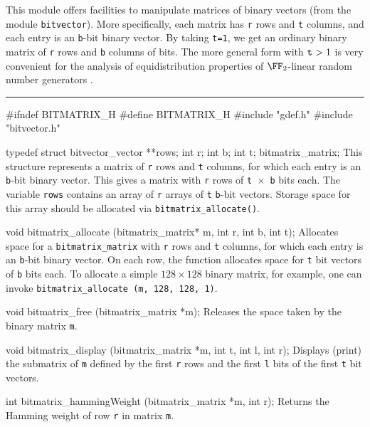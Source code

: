 
This module offers facilities to manipulate matrices of binary vectors
(from the module \texttt{bitvector}).
More specifically, each matrix has {\tt r} rows and {\tt t} columns,
and each entry is an {\tt b}-bit binary vector.
By taking {\tt t=1}, we get an ordinary binary matrix of {\tt r} rows and
{\tt b} columns of bits.
The more general form with ${\tt t} > 1$ is very convenient for the analysis of
equidistribution properties of $\FF_2$-linear random number generators
\cite{rLEC05a,rLEC09a,rPAN04t}.

\bigskip\hrule

\code\hide
#ifndef BITMATRIX_H
#define BITMATRIX_H
\endhide
#include "gdef.h"
#include "bitvector.h"
\endcode

\code

typedef struct{
  bitvector_vector **rows;
  int r;
  int b;
  int t;
} bitmatrix_matrix;
\endcode
 \tab
This structure represents a matrix of {\tt r} rows and {\tt t} columns,
for which each entry is an {\tt b}-bit binary vector.
This gives a matrix with {\tt r} rows of {\tt t $\times$ b} bits each.
The variable {\tt rows} contains an array of {\tt r} arrays of {\tt t} {\tt b}-bit vectors.
Storage space for this array should be allocated via {\tt bitmatrix\_allocate()}.
\endtab
\code

void bitmatrix_allocate (bitmatrix_matrix* m, int r, int b, int t);
\endcode
\tab
Allocates space for a {\tt bitmatrix\_matrix} with {\tt r} rows and {\tt t} columns,
for which each entry is an {\tt b}-bit binary vector.
On each row, the function allocates space for {\tt t} bit vectors of {\tt b} bits each.
To allocate a simple $128 \times 128$ binary matrix, for example, one can invoke
{\tt bitmatrix\_allocate (m, 128, 128, 1)}.
\endtab
\code

void bitmatrix_free (bitmatrix_matrix *m);
\endcode
 \tab
 Releases the space taken by the binary matrix {\tt m}.
 \endtab
\code

void bitmatrix_display (bitmatrix_matrix *m, int t, int l, int r);
\endcode
 \tab
Displays (print) the submatrix of {\tt *m} defined by the first {\tt r} rows and the
first {\tt l} bits of the first {\tt t} bit vectors.
 \endtab
 \code

int bitmatrix_hammingWeight (bitmatrix_matrix *m, int r);
\endcode
 \tab
 Returns the Hamming weight of row {\tt r} in matrix {\tt *m}.
 \endtab
 \code

